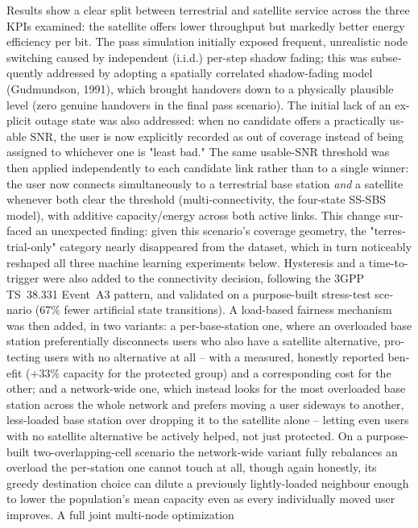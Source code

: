 \begin{english}
Results show a clear split between terrestrial and satellite service
across the three KPIs examined: the satellite offers lower throughput but
markedly better energy efficiency per bit. The pass simulation initially
exposed frequent, unrealistic node switching caused by independent
(i.i.d.) per-step shadow fading; this was subsequently addressed by
adopting a spatially correlated shadow-fading model (Gudmundson, 1991),
which brought handovers down to a physically plausible level (zero
genuine handovers in the final pass scenario). The initial lack of an
explicit outage state was also addressed: when no candidate offers a
practically usable SNR, the user is now explicitly recorded as out of
coverage instead of being assigned to whichever one is "least bad." The
same usable-SNR threshold was then applied independently to each
candidate link rather than to a single winner: the user now connects
simultaneously to a terrestrial base station \emph{and} a satellite
whenever both clear the threshold (multi-connectivity, the four-state
SS-SBS model), with additive capacity/energy across both active links.
This change surfaced an unexpected finding: given this scenario's
coverage geometry, the "terrestrial-only" category nearly disappeared
from the dataset, which in turn noticeably reshaped all three machine
learning experiments below. Hysteresis and a time-to-trigger were also
added to the connectivity decision, following the 3GPP TS~38.331 Event~A3
pattern, and validated on a purpose-built stress-test scenario ($67\%$
fewer artificial state transitions). A load-based
fairness mechanism was then added, in two variants: a per-base-station
one, where an overloaded base station preferentially disconnects users
who also have a satellite alternative, protecting users with no
alternative at all -- with a measured, honestly reported benefit
($+33\%$ capacity for the protected group) and a corresponding cost for
the other; and a network-wide one, which instead looks for the most
overloaded base station across the whole network and prefers moving a
user sideways to another, less-loaded base station over dropping it to
the satellite alone -- letting even users with no satellite alternative
be actively helped, not just protected. On a purpose-built two-overlapping-cell
scenario the network-wide variant fully rebalances an overload the
per-station one cannot touch at all, though again honestly, its
greedy destination choice can dilute a previously lightly-loaded
neighbour enough to lower the population's mean capacity even as every
individually moved user improves. A full joint multi-node optimization

\end{english}
